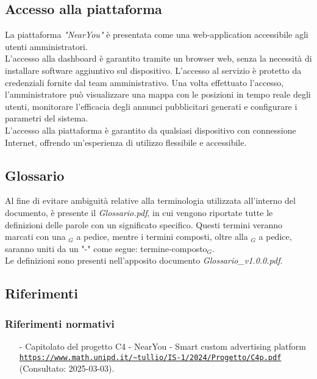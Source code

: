 \documentclass[10pt]{article}
\begin{document}
\begin{justify}
\subsection{Accesso alla piattaforma}
La piattaforma \textit{"NearYou"} è presentata come una web-application accessibile agli utenti amministratori.\\
L'accesso alla dashboard è garantito tramite un browser web, senza la necessità di installare software aggiuntivo sul dispositivo. L'accesso al servizio è protetto da credenziali fornite dal team amministrativo. Una volta effettuato l'accesso, l'amministratore può visualizzare una mappa con le posizioni in tempo reale degli utenti, monitorare l'efficacia degli annunci pubblicitari generati e configurare i parametri del sistema.\\
L'accesso alla piattaforma è garantito da qualsiasi dispositivo con connessione Internet, offrendo un'esperienza di utilizzo flessibile e accessibile.

\subsection{Glossario}
Al fine di evitare ambiguità relative alla terminologia utilizzata all'interno del documento, è presente il \textit{Glossario.pdf}, in cui vengono riportate tutte le definizioni delle parole con un significato specifico. Questi termini veranno marcati con una $_G$ a pedice, mentre i termini composti, oltre alla $_G$ a pedice, saranno uniti da un "-" come segue: termine-composto$_G$.\\
Le definizioni sono presenti nell'apposito documento \textit{Glossario\_v1.0.0.pdf}.

\subsection{Riferimenti}

\subsubsection{Riferimenti normativi}
\begin{itemize}
    \item[-] Capitolato del progetto C4 - NearYou - Smart custom advertising platform \\ 
    \textcolor{blue}{\texttt{\url{https://www.math.unipd.it/~tullio/IS-1/2024/Progetto/C4p.pdf}}} \\ 
    (Consultato: 2025-03-03).
    

\end{itemize}
\end{justify}
\end{document}
